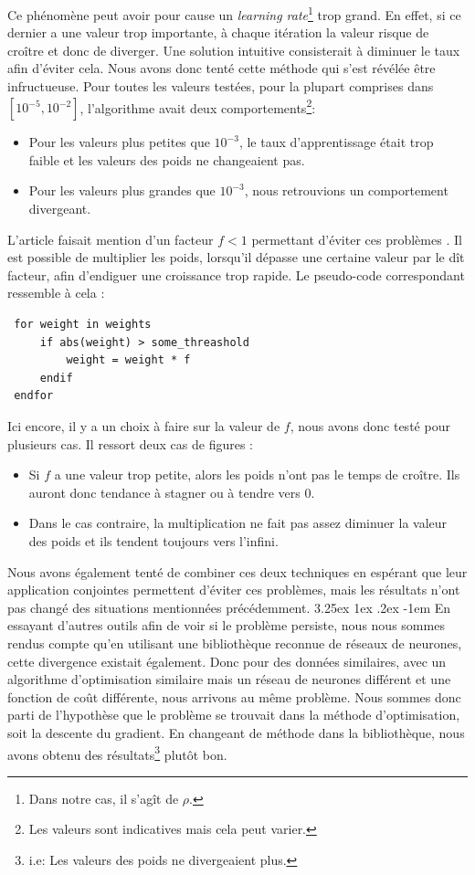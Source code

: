 \documentclass[a4paper, 11pt]{article}
\makeatletter
\renewcommand\paragraph{\@startsection{paragraph}{5}{\z@}%
  {3.25ex \@plus1ex \@minus.2ex}%
  {-1em}%
  {\normalfont\normalsize\bfseries}}
\makeatother
\begin{document}
Ce phénomène peut avoir pour cause un \textit{learning rate}\footnote{Dans notre cas, il s'agît de $\rho$.} trop grand. En effet, si ce dernier a une
valeur trop importante, à chaque itération la valeur risque de croître et donc de diverger. Une solution intuitive consisterait à diminuer le taux afin
d'éviter cela. Nous avons donc tenté cette méthode qui s'est révélée être infructueuse. Pour toutes les valeurs testées, pour la plupart comprises
dans $ [10^{-5},10^{-2}]$, l'algorithme avait deux comportements\footnote{Les valeurs sont indicatives mais cela peut varier.}:
\begin{itemize}
 \item Pour les valeurs plus petites que $10^{-3}$, le taux d'apprentissage était trop faible et les valeurs des poids ne changeaient pas.
 \item Pour les valeurs plus grandes que $10^{-3}$, nous retrouvions un comportement divergeant.
\end{itemize}

L'article faisait mention d'un facteur $f < 1$ permettant d'éviter ces problèmes \cite{fx_trading}. Il est possible de multiplier les poids, lorsqu'il 
dépasse une certaine valeur par le dît facteur, afin d'endiguer une croissance trop rapide. Le pseudo-code correspondant ressemble à cela :
\begin{lstlisting}
 for weight in weights
     if abs(weight) > some_threashold
         weight = weight * f
     endif
 endfor
\end{lstlisting}

Ici encore, il y a un choix à faire sur la valeur de $f$, nous avons donc testé pour plusieurs cas. Il ressort deux cas de figures :
\begin{itemize}
 \item Si $f$ a une valeur trop petite, alors les poids n'ont pas le temps de croître. Ils auront donc tendance à stagner ou à tendre vers $0$.
 \item Dans le cas contraire, la multiplication ne fait pas assez diminuer la valeur des poids et ils tendent toujours vers l'infini.
\end{itemize}

Nous avons également tenté de combiner ces deux techniques en espérant que leur application conjointes permettent d'éviter ces problèmes, mais les
résultats n'ont pas changé des situations mentionnées précédemment.
\paragraph{}
En essayant d'autres outils afin de voir si le problème persiste, nous nous sommes rendus compte qu'en utilisant une bibliothèque reconnue de réseaux de 
neurones\cite{keras}, cette divergence existait également. Donc pour des données similaires, avec un algorithme d'optimisation similaire mais un réseau de neurones
différent et une fonction de coût différente, nous arrivons au même problème.
Nous sommes donc parti de l'hypothèse que le problème se trouvait dans la méthode d'optimisation, soit la descente du gradient. En changeant de méthode
dans la bibliothèque, nous avons obtenu des résultats\footnote{i.e: Les valeurs des poids ne divergeaient plus.} plutôt bon.
\end{document}
